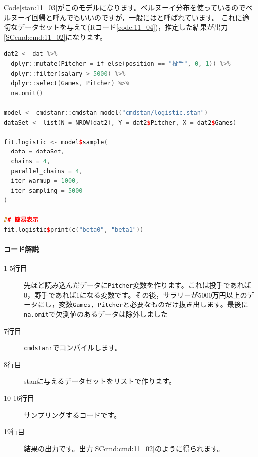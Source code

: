 \documentclass{ltjsbook}
\begin{document}
Code\ref{stan:11_03}がこのモデルになります。ベルヌーイ分布を使っているのでベルヌーイ回帰と呼んでもいいのですが，一般にはと呼ばれています。
これに適切なデータセットを与えて(Rコード\ref{code:11_04})，推定した結果が出力\ref{SCcmd:cmd:11_02}になります。

\begin{lstlisting}[language=c++,label={code:11_04},caption={ロジスティック回帰分析を実行するRコード}]
dat2 <- dat %>%
  dplyr::mutate(Pitcher = if_else(position == "投手", 0, 1)) %>%
  dplyr::filter(salary > 5000) %>%
  dplyr::select(Games, Pitcher) %>%
  na.omit()

model <- cmdstanr::cmdstan_model("cmdstan/logistic.stan")
dataSet <- list(N = NROW(dat2), Y = dat2$Pitcher, X = dat2$Games)

fit.logistic <- model$sample(
  data = dataSet,
  chains = 4,
  parallel_chains = 4,
  iter_warmup = 1000,
  iter_sampling = 5000
)

## 簡易表示
fit.logistic$print(c("beta0", "beta1"))
\end{lstlisting}
\paragraph{コード解説}
\begin{description}
	\item[1-5行目] 先ほど読み込んだデータに\verb|Pitcher|変数を作ります。これは投手であれば0，野手であれば1になる変数です。その後，サラリーが5000万円以上のデータにし，変数\verb|Games, Pitcher|と必要なものだけ抜き出します。最後に\verb|na.omit|で欠測値のあるデータは除外しました
	\item[7行目] \texttt{cmdstanr}でコンパイルします。
	\item[8行目] stanに与えるデータセットをリストで作ります。
	\item[10-16行目] サンプリングするコードです。
	\item[19行目] 結果の出力です。出力\ref{SCcmd:cmd:11_02}のように得られます。
\end{description}
\end{document}
